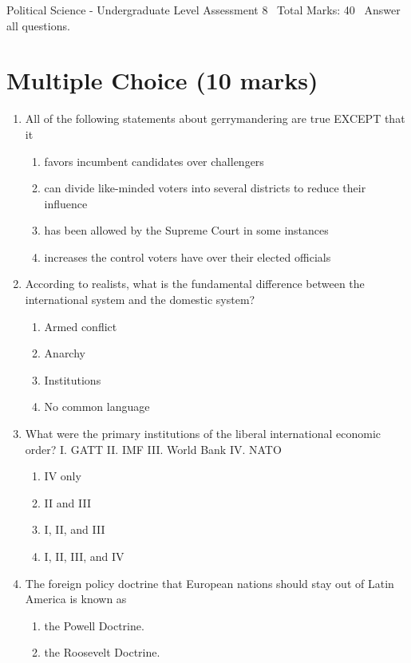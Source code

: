 \documentclass[12pt]{article}
\begin{document}
\begin{center}
Political Science - Undergraduate Level Assessment 8 \
Total Marks: 40 \
Answer all questions.
\end{center}

\section*{Multiple Choice (10 marks)}
\begin{enumerate}[label=\arabic*.]
\item All of the following statements about gerrymandering are true EXCEPT that it
\begin{enumerate}[label=(\alph*)]
    \item favors incumbent candidates over challengers
    \item can divide like-minded voters into several districts to reduce their influence
    \item has been allowed by the Supreme Court in some instances
    \item increases the control voters have over their elected officials
\end{enumerate}
\item According to realists, what is the fundamental difference between the international system and the domestic system?
\begin{enumerate}[label=(\alph*)]
    \item Armed conflict
    \item Anarchy
    \item Institutions
    \item No common language
\end{enumerate}
\item What were the primary institutions of the liberal international economic order? I. GATT II. IMF III. World Bank IV. NATO
\begin{enumerate}[label=(\alph*)]
    \item IV only
    \item II and III
    \item I, II, and III
    \item I, II, III, and IV
\end{enumerate}
\item The foreign policy doctrine that European nations should stay out of Latin America is known as
\begin{enumerate}[label=(\alph*)]
    \item the Powell Doctrine.
    \item the Roosevelt Doctrine.

\end{enumerate}
\end{enumerate}
\end{document}
